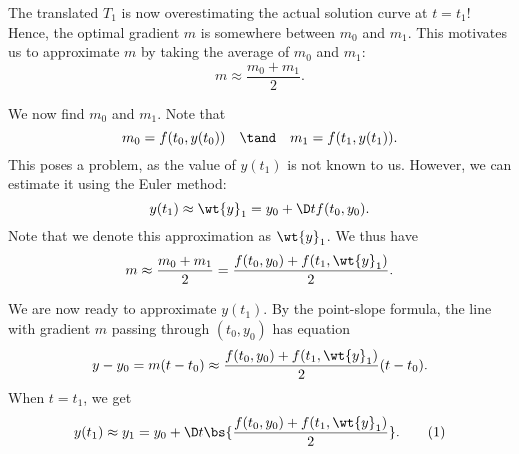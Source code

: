 \begin{figure}[H]
    \centering
    \caption{}
\end{figure}

The translated $T_1$ is now overestimating the actual solution curve at $t = t_1$! Hence, the optimal gradient $m$ is somewhere between $m_0$ and $m_1$. This motivates us to approximate $m$ by taking the average of $m_0$ and $m_1$: \[m \approx \frac{m_0 + m_1}{2}.\]

We now find $m_0$ and $m_1$. Note that \[m_0 = f(t_0, y(t_0)) \quad \tand \quad m_1 = f(t_1, y(t_1)).\] This poses a problem, as the value of $y(t_1)$ is not known to us. However, we can estimate it using the Euler method: \[y(t_1) \approx \wt{y}_1 = y_0 + \D t f(t_0, y_0).\] Note that we denote this approximation as $\wt{y}_1$. We thus have \[m \approx \frac{m_0 + m_1}{2} = \frac{f(t_0, y_0) + f(t_1, \wt{y}_1)}{2}.\]

We are now ready to approximate $y(t_1)$. By the point-slope formula, the line with gradient $m$ passing through $(t_0, y_0)$ has equation \[y - y_0 = m (t - t_0) \approx \frac{f(t_0, y_0) + f(t_1, \wt{y}_1)}{2} (t - t_0).\] When $t = t_1$, we get \[y(t_1) \approx y_1 = y_0 + \D t \bs{\frac{f(t_0, y_0) + f(t_1, \wt{y}_1)}{2}}. \tag{1}\]

